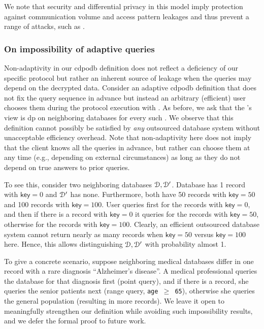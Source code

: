 	\begin{remark}[Informal]
		We note that security and differential privacy in this model imply protection against communication volume and access pattern leakages and thus prevent a range of attacks, such as \cite{leakage-abuse-attacks-cash-15,inference-attacks-naveed-15,generic-attacks-kellaris}. %
	\end{remark}

	\subsubsection{On impossibility of adaptive queries}\label{section:range-persistent:dpodb:adversarial-models:adaptive}

		Non-adaptivity in our \acrshort{cdpodb} definition does not reflect a deficiency of our specific protocol but rather an inherent source of leakage when the queries may depend on the decrypted data.
		Consider an adaptive \acrshort{cdpodb} definition that does not fix the query sequence  in advance but instead an arbitrary (efficient) user \user{} chooses them during the protocol execution with \server{}.
		As before, we ask that the \server{}'s view is \acrshort{dp} on neighboring databases for every such \user{}.
		We observe that this definition cannot possibly be satisfied by \emph{any} outsourced database system without unacceptable efficiency overhead.
		Note that non-adaptivity here does not imply that the client knows all the queries in advance, but rather can choose them at any time (e.g., depending on external circumstances) as long as they do not depend on true answers to prior queries.

		To see this, consider two neighboring databases $\mathcal{D}, \mathcal{D}^\prime$.
		Database \database{} has 1 record with $\mathsf{key} = 0$ and $\mathcal{D}^\prime$ has none.
		Furthermore, both have 50 records with $\mathsf{key} = 50$ and 100 records with $\mathsf{key} = 100$.
		User \user{} queries first for the records with $\mathsf{key} = 0$, and then if there is a record with $\mathsf{key} = 0$ it queries for the records with $\mathsf{key} = 50$, otherwise for the records with $\mathsf{key} = 100$.
		Clearly, an efficient outsourced database system cannot return nearly as many records when $\mathsf{key} = 50$ versus $\mathsf{key} = 100$ here.
		Hence, this allows distinguishing $\mathcal{D}, \mathcal{D}^\prime$ with probability almost 1.

		To give a concrete scenario, suppose neighboring medical databases differ in one record with a rare diagnosis ``Alzheimer's disease''.
		A medical professional queries the database for that diagnosis first (point query), and if there is a record, she queries the senior patients next (range query, \texttt{age $\ge$ 65}), otherwise she queries the general population (resulting in more records).
		We leave it open to meaningfully strengthen our definition while avoiding such impossibility results, and we defer the formal proof to future work.

